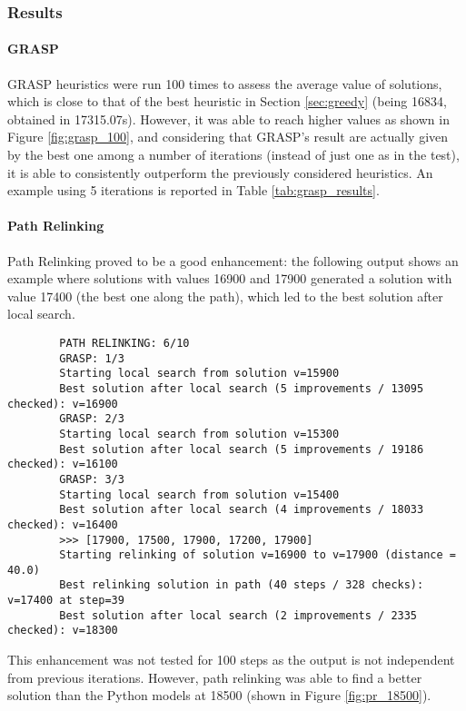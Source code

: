 \subsubsection{Results}
\paragraph{GRASP} GRASP heuristics were run 100 times to assess the average value of solutions, which is close to that of the best heuristic in Section \ref{sec:greedy} (being 16834, obtained in 17315.07s). However, it was able to reach higher values as shown in Figure \ref{fig:grasp_100}, and considering that GRASP's result are actually given by the best one among a number of iterations (instead of just one as in the test), it is able to consistently outperform the previously considered heuristics. An example using 5 iterations is reported in Table \ref{tab:grasp_results}.

\paragraph{Path Relinking} Path Relinking proved to be a good enhancement: the following output shows an example where solutions with values 16900 and 17900 generated a solution with value 17400 (the best one along the path), which led to the best solution after local search.

\begin{footnotesize}
	\begin{verbatim}
		PATH RELINKING: 6/10
		GRASP: 1/3
		Starting local search from solution v=15900
		Best solution after local search (5 improvements / 13095 checked): v=16900
		GRASP: 2/3
		Starting local search from solution v=15300
		Best solution after local search (5 improvements / 19186 checked): v=16100
		GRASP: 3/3
		Starting local search from solution v=15400
		Best solution after local search (4 improvements / 18033 checked): v=16400
		>>> [17900, 17500, 17900, 17200, 17900]
		Starting relinking of solution v=16900 to v=17900 (distance = 40.0)
		Best relinking solution in path (40 steps / 328 checks): v=17400 at step=39
		Best solution after local search (2 improvements / 2335 checked): v=18300
	\end{verbatim}
\end{footnotesize}
This enhancement was not tested for 100 steps as the output is not independent from previous iterations. However, path relinking was able to find a better solution than the Python models at 18500 (shown in Figure \ref{fig:pr_18500}). 


